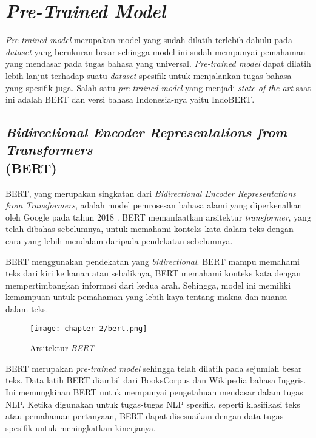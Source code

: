 \section{\textit{Pre-Trained Model}}

\textit{Pre-trained model} merupakan model yang sudah dilatih terlebih dahulu pada \textit{dataset} yang berukuran besar sehingga model ini sudah mempunyai pemahaman yang mendasar pada tugas bahasa yang universal. \textit{Pre-trained model} dapat dilatih lebih lanjut terhadap suatu \textit{dataset} spesifik untuk menjalankan tugas bahasa yang spesifik juga. Salah satu \textit{pre-trained model} yang menjadi \textit{state-of-the-art} saat ini adalah BERT dan versi bahasa Indonesia-nya yaitu IndoBERT. 

\subsection{\textit{Bidirectional Encoder Representations from Transformers} \\ (BERT)}

BERT, yang merupakan singkatan dari \textit{Bidirectional Encoder Representations from Transformers}, adalah model pemrosesan bahasa alami yang diperkenalkan oleh Google pada tahun 2018 \parencite{bert}. BERT memanfaatkan arsitektur \textit{transformer}, yang telah dibahas sebelumnya, untuk memahami konteks kata dalam teks dengan cara yang lebih mendalam daripada pendekatan sebelumnya.

BERT menggunakan pendekatan yang \textit{bidirectional}. BERT mampu memahami teks dari kiri ke kanan atau sebaliknya, BERT memahami konteks kata dengan mempertimbangkan informasi dari kedua arah. Sehingga, model ini memiliki kemampuan untuk pemahaman yang lebih kaya tentang makna dan nuansa dalam teks.

\begin{figure}[ht]
    \centering
    \texttt{[image: chapter-2/bert.png]}
    \caption{Arsitektur \textit{BERT} \parencite{bert}}
    \label{fig:bert}
\end{figure}

BERT merupakan \textit{pre-trained model} sehingga telah dilatih pada sejumlah besar teks. Data latih BERT diambil dari BooksCorpus dan Wikipedia bahasa Inggris. Ini memungkinan BERT untuk mempunyai pengetahuan mendasar dalam tugas NLP. Ketika digunakan untuk tugas-tugas NLP spesifik, seperti klasifikasi teks atau pemahaman pertanyaan, BERT dapat disesuaikan dengan data tugas spesifik untuk meningkatkan kinerjanya.


